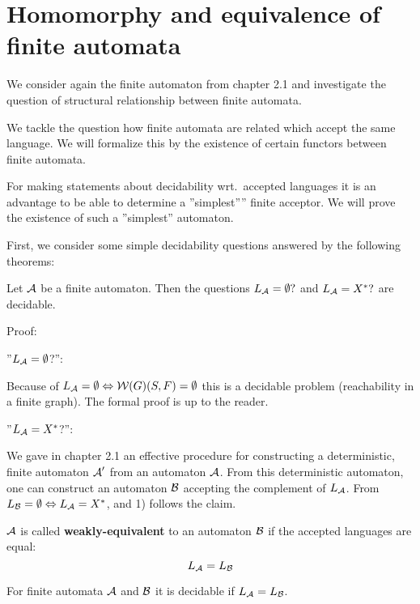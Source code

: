\section{Homomorphy and equivalence of finite automata}

We consider again the finite automaton from chapter 2.1 and investigate the
question of structural relationship between finite automata.

We tackle the question how finite automata are related which accept the same
language. We will formalize this by the existence of certain functors between
finite automata.

For making statements about decidability wrt.\ accepted languages it is an
advantage to be able to determine a ''simplest'''' finite acceptor. We will
prove the existence of such a ''simplest'' automaton.

First, we consider some simple decidability questions answered by the following
theorems:

\begin{theorem}
Let $\mbox{$\mathcal{A}$}$ be a finite automaton. Then the questions $\mbox{$L_{\mathcal{A}}$} = \emptyset?$
and $\mbox{$L_{\mathcal{A}}$} = X^*?$ are decidable.
\end{theorem}

Proof:

''$\mbox{$L_{\mathcal{A}}$} = \emptyset$?'':

Because of $\mbox{$L_{\mathcal{A}}$} = \emptyset \Leftrightarrow \mbox{$\mathcal{W}(G)$}(S, F) =
\emptyset$ this is a decidable problem (reachability in a finite graph). The
formal proof is up to the reader.

''$\mbox{$L_{\mathcal{A}}$} = X^*$?'':

We gave in chapter 2.1 an effective procedure for constructing a deterministic,
finite automaton $\mbox{$\mathcal{A}$}'$ from an automaton $\mbox{$\mathcal{A}$}$. From this deterministic
automaton, one can construct an automaton $\mbox{$\mathcal{B}$}$ accepting the complement of
$\mbox{$L_{\mathcal{A}}$}$. From $\mbox{$L_{\mathcal{B}}$} = \emptyset \Leftrightarrow \mbox{$L_{\mathcal{A}}$} = X^*$,
and 1) follows the claim.

\begin{definition}
$\mbox{$\mathcal{A}$}$ is called {\bf weakly-equivalent} to an automaton $\mbox{$\mathcal{B}$}$ if the
accepted languages are equal: \[ \mbox{$L_{\mathcal{A}}$} = \mbox{$L_{\mathcal{B}}$} \]
\end{definition}

\begin{theorem}
For finite automata $\mbox{$\mathcal{A}$}$ and $\mbox{$\mathcal{B}$}$ it is decidable if $\mbox{$L_{\mathcal{A}}$} =
\mbox{$L_{\mathcal{B}}$}$.
\end{theorem}

